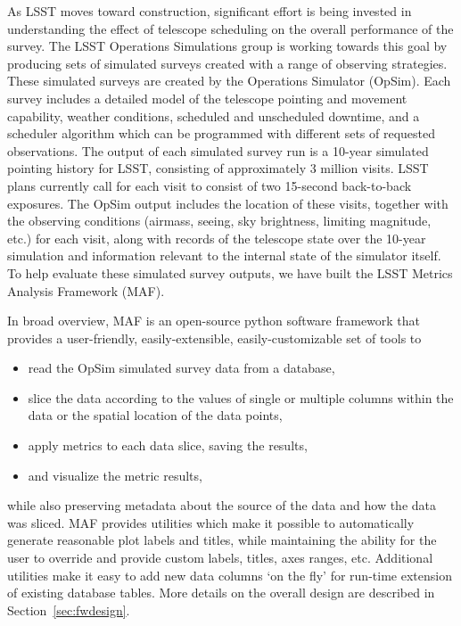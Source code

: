 \documentclass[]{spie}  %
\begin{document}
As LSST moves toward construction, significant effort is being
invested in understanding the effect of telescope scheduling on the
overall performance of the survey. The LSST Operations Simulations
group is working towards this goal by producing sets of simulated
surveys created with a range of observing strategies. These simulated
surveys are created by the Operations Simulator (OpSim)\cite{opsim3,
  opsim2, opsim1}. Each survey includes a detailed model of the
telescope pointing and movement capability, weather conditions,
scheduled and unscheduled downtime, and a scheduler algorithm which
can be programmed with different sets of requested observations. The
output of each simulated survey run is a 10-year simulated pointing
history for LSST, consisting of approximately 3 million visits. LSST
plans currently call for each visit to consist of two 15-second
back-to-back exposures.  The OpSim output includes the location of
these visits, together with the observing conditions (airmass, seeing,
sky brightness, limiting magnitude, etc.) for each visit, along with
records of the telescope state over the 10-year simulation and
information relevant to the internal state of the simulator itself. To
help evaluate these simulated survey outputs, we have built the LSST
Metrics Analysis Framework (MAF).

In broad overview, MAF is an open-source python software framework that
provides a user-friendly, easily-extensible, easily-customizable set of tools to 
\begin{itemize}
\item{read the OpSim simulated survey data from a database,}
\item{slice the data according to the values of single or multiple
columns within the data or the spatial location of the data points,}
\item{apply metrics to each data slice, saving the results,}
\item{and visualize the metric results,}
\end{itemize}
while also preserving metadata about the source of the data and how the
data was sliced. MAF provides utilities which make it possible
to automatically generate reasonable plot labels and titles, while
maintaining the ability for the user to override and provide custom
labels, titles, axes ranges, etc. Additional utilities make it easy to
add new data columns `on the fly' for run-time extension of
existing database tables. More details on the overall design are
described in Section~\ref{sec:fwdesign}. 
\end{document}
